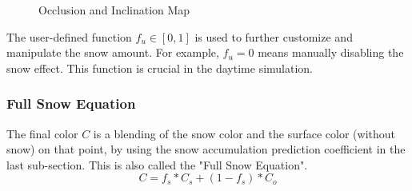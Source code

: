 \documentclass{article}
\begin{document}
\begin{figure}[h]
  \centering
  \caption{Occlusion and Inclination Map}
  \label{fig:Maps}
\end{figure}



The user-defined function \( f_{u} \in [0, 1]\) is used to further customize and manipulate the snow amount. For example, 
\( f_{u}=0 \) means manually disabling the snow effect. This function is crucial in the daytime simulation.

\subsubsection {Full Snow Equation}
The final color \( C \) is a blending of the snow color and the surface color (without snow) on that point, by using the snow accumulation 
prediction coefficient in the last sub-section. This is also called the "Full Snow Equation".
\[
  C = f_{s} * C_{s} + (1-f_{s}) * C_{o}
\]
\end{document}
